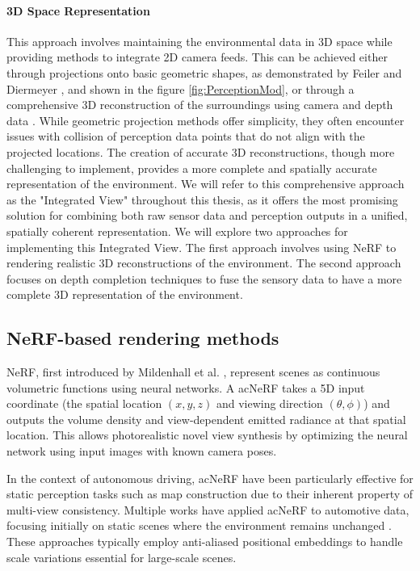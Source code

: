 \paragraph{3D Space Representation} This approach involves maintaining the environmental
data in 3D space while providing methods to integrate 2D camera feeds. This can be
achieved either through projections onto basic geometric shapes, as demonstrated by
Feiler and Diermeyer \cite{feiler2023perception}, and shown in the figure \ref{fig:PerceptionMod}, or through a comprehensive 3D reconstruction of the surroundings using camera and depth data
. While geometric projection methods offer simplicity, they often encounter issues with collision of perception data points
that do not align with the projected locations. The creation of accurate 3D reconstructions, though more challenging to implement,
provides a more complete and spatially accurate representation of the environment. We will refer to this
comprehensive approach as the "Integrated View" throughout this thesis, as it offers the most promising solution for
combining both raw sensor data and perception outputs in a unified, spatially coherent representation. We will explore
two approaches for implementing this Integrated View. The first approach involves using \ac{NeRF} to rendering
realistic 3D reconstructions of the environment. The second approach focuses on depth completion techniques to fuse the sensory data
to have a more complete 3D representation of the environment.

\subsection{NeRF-based rendering methods}
\ac{NeRF}, first introduced by Mildenhall et al. \cite{mildenhall2020nerf}, represent scenes as continuous volumetric functions using neural networks. A ac{NeRF} takes a 5D input coordinate (the spatial location $(x,y,z)$ and viewing direction $(\theta,\phi)$) and outputs the volume density and view-dependent emitted radiance at that spatial location. This allows photorealistic novel view synthesis by optimizing the neural network using input images with known camera poses.

In the context of autonomous driving, ac{NeRF} have been particularly effective for static perception tasks such as map construction due to their inherent property of multi-view consistency. Multiple works have applied ac{NeRF} to automotive data, focusing initially on static scenes where the environment remains unchanged \cite{snerf2023}. These approaches typically employ anti-aliased positional embeddings to handle scale variations essential for large-scale scenes.

